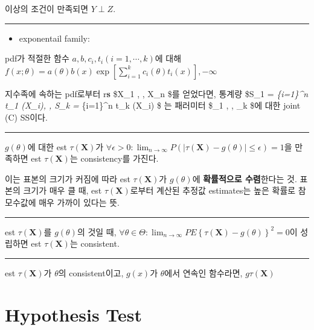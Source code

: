 \documentclass[
]{book}
\providecommand{\tightlist}{%
  \setlength{\itemsep}{0pt}\setlength{\parskip}{0pt}}
\begin{document}
이상의 조건이 만족되면 \(Y \perp Z\).

\begin{center}\rule{0.5\linewidth}{0.5pt}\end{center}

\begin{itemize}
\tightlist
\item
  exponentail family:
\end{itemize}

pdf가 적절한 함수 \(a, b, c_i, t_i (i=1,\cdots, k)\)에 대해 \(f(x;\theta) = a(\theta) b(x) \exp \left[ \sum_{i=1}^k c_i (\theta) t_i (x) \right], -\infty\)

지수족에 속하는 pdf로부터 r\textbf{s} \$X\_1 , \cdots, X\_n \$를 얻었다면, 통계량 \$S\_1 = \sum\emph{\{i=1\}\^{}n t\_1 (X\_i), \cdots, S\_k = \sum}\{i=1\}\^{}n t\_k (X\_i) \$ 는 패러미터 \$\theta\_1 , \cdots, \theta\_k \$에 대한 joint (C) SS이다.

\begin{center}\rule{0.5\linewidth}{0.5pt}\end{center}

\(g(\theta)\)에 대한 est \(\tau(\pmb X)\)가 \(\forall \epsilon >0: \lim_{n \rightarrow \infty} P \left( \vert \tau(\pmb X) - g(\theta) \vert \le \epsilon \right) =1\)을 만족하면 est \(\tau(\pmb X)\)는 consistency를 가진다.

이는 표본의 크기가 커짐에 따라 est \(\tau(\pmb X)\)가 \(g(\theta)\)에 \textbf{확률적으로 수렴}한다는 것. 표본의 크기가 매우 클 때, est \(\tau(\pmb X)\)로부터 계산된 추정값 estimates는 높은 확률로 참모수값에 매우 가까이 있다는 뜻.

\begin{center}\rule{0.5\linewidth}{0.5pt}\end{center}

est \(\tau(\pmb X)\)를 \(g(\theta)\)의 것일 때, \(\forall \theta \in \Theta: \lim_{n \rightarrow \infty} P E \left\{ \tau(\pmb X)-g(\theta)\right\}^2 = 0\)이 성립하면 est \(\tau(\pmb X)\)는 consistent.

\begin{center}\rule{0.5\linewidth}{0.5pt}\end{center}

est \(\tau(\pmb X)\)가 \(\theta\)의 consistent이고, \(g(x)\)가 \(\theta\)에서 연속인 함수라면, \(g\tau(\pmb X)\)

\hypertarget{hypothesis-test}{%
\section{Hypothesis Test}\label{hypothesis-test}}
\end{document}
